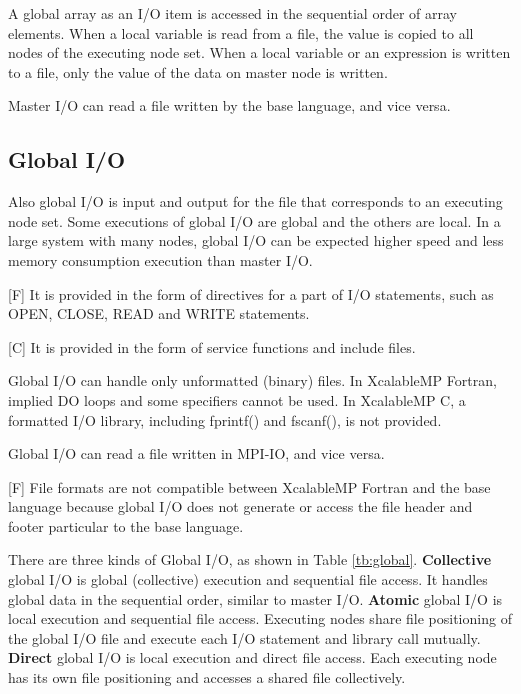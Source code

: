   A global array as an I/O item is accessed in the sequential order of
  array elements.
  When a local variable is read from a file, the value is copied to all
  nodes of the executing node set.
  When a local variable or an expression is written to a file, only the
  value of the data on master node is written.
  
  Master I/O can read a file written by the base language, and vice
  versa.
  

  \subsection{Global I/O}

  Also global I/O is input and output for the file that corresponds to
  an executing node set.
  Some executions of global I/O are global and the others are local.
  In a large system with many nodes, global I/O can be expected higher
  speed and less memory consumption execution than master I/O.

  [F] It is provided in the form of directives for a part of I/O
  statements, such as OPEN, CLOSE, READ
  and WRITE statements.

  [C] It is provided in the form of service functions and include files.

  Global I/O can handle only unformatted (binary) files. In XcalableMP Fortran,
  implied DO loops and some specifiers cannot be used.
  In XcalableMP C, a formatted I/O library, including fprintf() and fscanf(), is not provided.

  Global I/O can read a file written in MPI-IO, and vice versa. 

  [F] File formats are not compatible between XcalableMP Fortran
  and the base language because global I/O does not generate or access
  the file header and footer particular to the base language.

  There are three kinds of Global I/O, as shown in Table
  \ref{tb:global}.
  {\bf Collective} global I/O is global (collective) execution and
  sequential file access.
  It handles global data in the sequential order, similar to master
  I/O.
  {\bf Atomic} global I/O is local execution and sequential file access.
  Executing nodes share file positioning of the global I/O file and
  execute each I/O statement and library call mutually.
  {\bf Direct} global I/O is local execution and direct file access.
  Each executing node has its own file positioning and accesses a shared
  file collectively.

